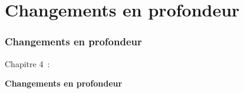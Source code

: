 %

\section{Changements en profondeur}
\begin{frame}[fragile]
	\frametitle{Changements en profondeur}

	\begin{center}\huge{Chapitre 4~:}\end{center}
	\begin{center}\huge{\color{typo3darkgrey}\textbf{Changements en profondeur}}\end{center}

\end{frame}


